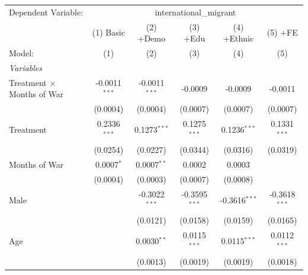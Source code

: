 
\begingroup
\centering
\begin{tabular}{lccccc}
   \tabularnewline \midrule \midrule
   Dependent Variable: & \multicolumn{5}{c}{international\_migrant}\\
                                     & (1) Basic       & (2) +Demo                      & (3) +Edu                & (4) +Ethnic             & (5) +FE \\   
   Model:                            & (1)             & (2)                            & (3)                     & (4)                     & (5)\\  
   \midrule
   \emph{Variables}\\
   Treatment $\times$ Months of War  & -0.0011$^{***}$ & -0.0011$^{***}$                & -0.0009                 & -0.0009                 & -0.0011\\   
                                     & (0.0004)        & (0.0004)                       & (0.0007)                & (0.0007)                & (0.0007)\\   
   Treatment                         & 0.2336$^{***}$  & 0.1273$^{***}$                 & 0.1275$^{***}$          & 0.1236$^{***}$          & 0.1331$^{***}$\\   
                                     & (0.0254)        & (0.0227)                       & (0.0344)                & (0.0316)                & (0.0319)\\   
   Months of War                     & 0.0007$^{*}$    & 0.0007$^{**}$                  & 0.0002                  & 0.0003                  &   \\   
                                     & (0.0004)        & (0.0003)                       & (0.0007)                & (0.0008)                &   \\   
   Male                              &                 & -0.3022$^{***}$                & -0.3595$^{***}$         & -0.3616$^{***}$         & -0.3618$^{***}$\\   
                                     &                 & (0.0121)                       & (0.0158)                & (0.0159)                & (0.0165)\\   
   Age                               &                 & 0.0030$^{**}$                  & 0.0115$^{***}$          & 0.0115$^{***}$          & 0.0112$^{***}$\\   
                                     &                 & (0.0013)                       & (0.0019)                & (0.0019)                & (0.0018)\\   

\end{tabular}
